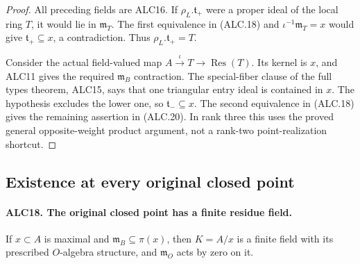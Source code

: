 \begin{proof}
All preceding fields are ALC16.  If
\(\rho_L.\mathfrak t_+\) were a proper ideal of the local
ring \(T\), it would lie in \(\mathfrak m_T\).
The first equivalence in (ALC.18) and
\(\iota^{-1}\mathfrak m_T=x\) would give
\(\mathfrak t_+\subseteq x\), a contradiction.
Thus \(\rho_L.\mathfrak t_+=T\).

Consider the actual field-valued map
\(A\xrightarrow{\iota}T\to\operatorname{Res}(T)\).
Its kernel is \(x\), and ALC11 gives the required
\(\mathfrak m_B\) contraction.  The special-fiber clause
of the full types theorem, ALC15, says that one triangular
entry ideal is contained in \(x\).  The hypothesis excludes
the lower one, so \(\mathfrak t_-\subseteq x\).
The second equivalence in (ALC.18) gives the remaining
assertion in (ALC.20).  In rank three this uses the proved
general opposite-weight product argument, not a rank-two
point-realization shortcut.
\end{proof}

\subsection{Existence at every original closed point}

\paragraph{ALC18. The original closed point has a finite residue field.}
\label{claim:ALC18}
If \(x\subset A\) is maximal and
\(\mathfrak m_B\subseteq\pi(x)\), then \(K=A/x\)
is a finite field with its prescribed \(O\)-algebra
structure, and \(\mathfrak m_O\) acts by zero on it.

